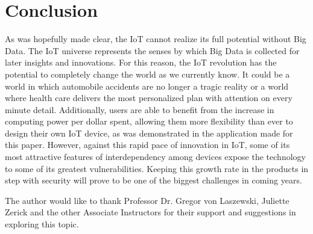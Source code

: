 \documentclass[sigconf]{acmart}
\begin{document}
\section{Conclusion}
As was hopefully made clear, the IoT cannot realize its full potential without Big Data. The IoT universe represents the senses by which Big Data is collected for later insights and innovations. For this reason, the IoT revolution has the potential to completely change the world as we currently know. It could be a world in which automobile accidents are no longer a tragic reality or a world where health care delivers the most personalized plan with attention on every minute detail. Additionally, users are able to benefit from the increase in computing power per dollar spent, allowing them more flexibility than ever to design their own IoT device, as was demonstrated in the application made for this paper. However, against this rapid pace of innovation in IoT, some of its most attractive features of interdependency among devices expose the technology to some of its greatest vulnerabilities. Keeping this growth rate in the products in step with security will prove to be one of the biggest challenges in coming years. 





 
 
 
\begin{acks}
The author would like to thank Professor Dr. Gregor von Laszewski, Juliette Zerick and the other Associate Instructors for their support and suggestions in exploring this topic.
\end{acks}


 

%
\end{document}
